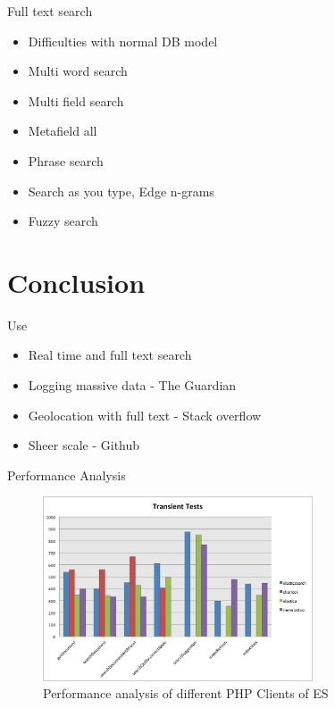 \documentclass[10pt]{beamer}
\begin{document}
\begin{frame}{Full text search}
	\begin{itemize}
		\item Difficulties with normal DB model
		\item Multi word search
		\item Multi field search
		\item Metafield all
		\item Phrase search
		\item Search as you type, Edge n-grams
		\item Fuzzy search
	\end{itemize}
\end{frame}


\section{Conclusion}
\begin{frame}{Use}
	\begin{itemize}
		\item Real time and full text search
		\item Logging massive data - The Guardian
		\item Geolocation with full text - Stack overflow
		\item Sheer scale - Github
	\end{itemize}
\end{frame}

\begin{frame}{Performance Analysis}
	\begin{figure}
		\centering\includegraphics[width=8cm]{clients}
		\caption{Performance analysis of different PHP Clients of ES}
	\end{figure}
\end{frame}
\end{document}
